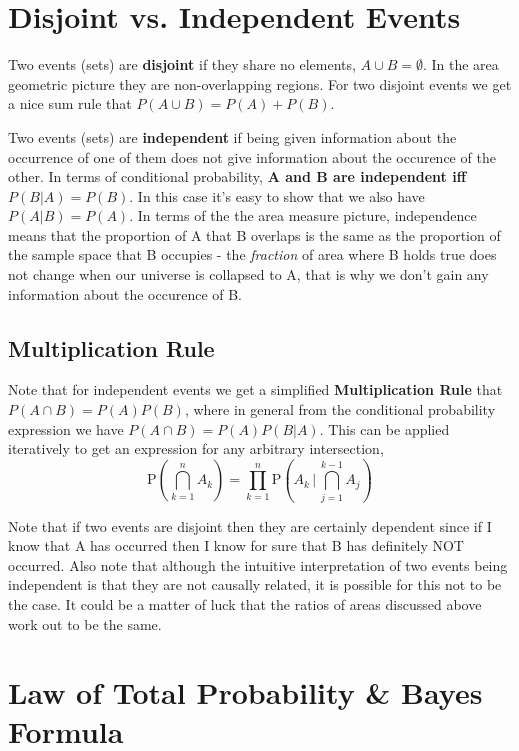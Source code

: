 \section{Disjoint vs. Independent Events}

Two events (sets) are \textbf{disjoint} if they share no elements, $A\cup B = \emptyset$. In the area geometric picture they are non-overlapping regions. For two disjoint events we  get a nice sum rule that $P(A\cup B)=P(A)+P(B)$.
\nn

Two events (sets) are \textbf{independent} if being given information about the occurrence of one of them does not give information about the occurence of the other. In terms of conditional probability, \textbf{A and B are independent iff $P(B|A) = P(B)$}. In this case it's easy to show that we also have $P(A|B) = P(A)$. In terms of the the area measure picture, independence means that the proportion of A that B overlaps is the same as the proportion of the sample space that B occupies - the \textit{fraction} of area where B holds true does not change when our universe is collapsed to A, that is why we don't gain any information about the occurence of B.
\n\n

\subsection{Multiplication Rule}
Note that for independent events we get a simplified \textbf{Multiplication Rule} that $P(A\cap B)=P(A)P(B)$, where in general from the conditional probability expression we have $P(A\cap B)=P(A)P(B|A)$. This can be applied iteratively to get an expression for any arbitrary intersection,
\begin{equation}
\mathrm  P\left(\bigcap_{k=1}^n A_k\right)  = \prod_{k=1}^n  \mathrm P\left(A_k \,\Bigg|\, \bigcap_{j=1}^{k-1} A_j\right)
\end{equation}
\nn

Note that if two events are disjoint then they are certainly dependent since if I know that A has occurred then I know for sure that B has definitely NOT occurred. Also note that although the intuitive interpretation of two events being independent is that they are not causally related, it is possible for this not to be the case. It could be a matter of luck that the ratios of areas discussed above work out to be the same.


\section{Law of Total Probability \& Bayes Formula}

